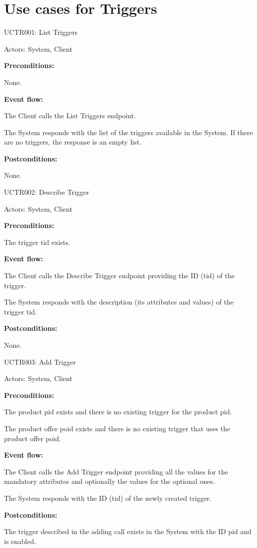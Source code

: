 \section{Use cases for Triggers}

\begin{ucbox}{UCTR001: List Triggers}
\label{UCTR001}

Actors: System, Client

\textbf{Preconditions:}

\ucitem None.

\textbf{Event flow:}

\ucitem The Client calls the List Triggers endpoint.

\ucitem The System responds with the list of the triggers available in the System. If there are no triggers, the response is an empty list.

\textbf{Postconditions:}

\ucitem None.

\end{ucbox}

\begin{ucbox}{UCTR002: Describe Trigger}
\label{UCTR002}

Actors: System, Client

\textbf{Preconditions:}

\ucitem The trigger tid exists.

\textbf{Event flow:}

\ucitem The Client calls the Describe Trigger endpoint providing the ID (tid) of the trigger.

\ucitem The System responds with the description (its attributes and values) of the trigger tid.

\textbf{Postconditions:}

\ucitem None.

\end{ucbox}

\begin{ucbox}{UCTR003: Add Trigger}
\label{UCTR003}

Actors: System, Client

\textbf{Preconditions:}

\ucitem The product pid exists and there is no existing trigger for the product pid.

\ucitem The product offer poid exists and there is no existing trigger that uses the product offer poid.

\textbf{Event flow:}

\ucitem The Client calls the Add Trigger endpoint providing all the values for the mandatory attributes and optionally the values for the optional ones.

\ucitem The System responds with the ID (tid) of the newly created trigger.

\textbf{Postconditions:}

\ucitem The trigger described in the adding call exists in the System with the ID pid and is enabled.

\end{ucbox}

